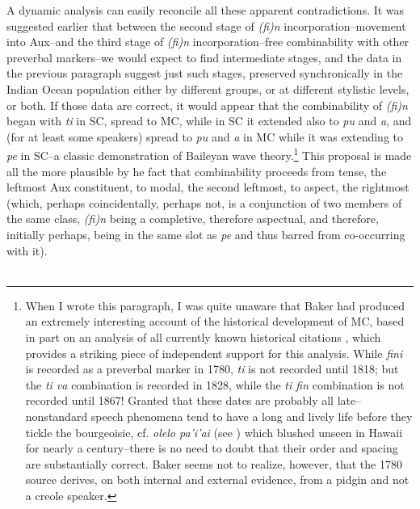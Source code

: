 A dynamic analysis can easily reconcile all these apparent contradictions. It was suggested earlier that between the second stage of \textit{(fi)n} incorporation--movement into Aux--and the third stage of \textit{(fi)n} incorporation--free combinability with other preverbal markers--we would expect to find intermediate stages, and the data in the previous paragraph suggest just such stages, preserved synchronically in the Indian Ocean population either by different groups, or at different stylistic levels, or both. If those data are correct, it would appear that the combinability of \textit{(fi)n} began with \textit{ti} in SC, spread to MC, while in SC it extended also to \textit{pu} and \textit{a}, and (for at least some speakers) spread to \textit{pu} and \textit{a} in MC while it was extending to \textit{pe} in SC--a classic demonstration of Baileyan wave theory.\footnote{When I wrote this paragraph, I was quite unaware that Baker had produced an extremely interesting account of the historical de\-velopment of MC, based in part on an analysis of all currently known historical citations \citep{Baker1976}, which provides a striking piece of independent support for this analysis. While \textit{fini} is recorded as a pre\-verbal marker in 1780, \textit{ti} is not recorded until 1818; but the \textit{ti va} combination is recorded in 1828, while the \textit{ti fin} combination is not recorded until 1867! Granted that these dates are probably all late--nonstandard speech phenomena tend to have a long and lively life before they tickle the bourgeoisie, cf. \textit{olelo pa'i'ai} (see ) which blushed unseen in Hawaii for nearly a century--there is no need to doubt that their order and spacing are substantially correct. Baker seems not to realize, however, that the 1780 source derives, on both internal and external evidence, from a pidgin and not a creole speaker.} This proposal is made all the more plausible by he fact that combinability proceeds from tense, the leftmost Aux constituent, to modal, the second leftmost, to aspect, the rightmost (which, perhaps coincidentally, perhaps
not, is a conjunction of two members of the same class, \textit{(fi)n} being a completive, therefore aspectual, and therefore, initially perhaps, being in the same slot as \textit{pe} and thus barred from co-occurring with it).\\\\

